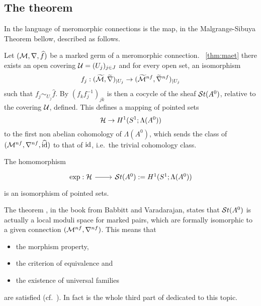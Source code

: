 \subsection{The theorem}
In the language of meromorphic connections is the map, in the Malgrange-Sibuya
Theorem bellow, described as follows.

Let $(\mathcal{M},\nabla,\widehat f)$ be a marked germ of a  meromorphic connection.
~\ref{thm:maet} there exists an open covering
$\mathcal{U}=(U_j)_{j\in J}$ and for every open set, an isomorphism
\[
  f_j:(\widetilde{\mathcal{M}},\widetilde\nabla)_{|U_j}
  \to(\widetilde{\mathcal{M}}^{nf},\widetilde\nabla^{nf})_{|U_j}
\]
such that $f_j\sim_{U_j}\hat f$.
By $(f_kf_j^{-1})_{jk}$ is then a cocycle of the sheaf $\mathcal{S}{}t(A^0)$, relative
to the covering $\mathcal{U}$, defined.
This defines a mapping of pointed sets
\[
  \mathcal{H}\to H^1(S^1;\Lambda(A^0))
\]
to the first non abelian cohomology of $\Lambda(A^0)$, which sends the class of
$(\mathcal{M}^{nf},\nabla^{nf},\widehat{\operatorname{id}})$ to that of $\operatorname{id}$, i.e.\ the trivial cohomology
class.

\begin{center}
  \begin{minipage}[t]{0.8\textwidth}
    \begin{tthm} \label{thm:mainThm1MeromVersion}
      The homomorphism
      \[ \begin{tikzcd}
          \exp:\cH \rar& \St(A^0):=H^1(S^1;\Lambda(A^0))
      \end{tikzcd} \]
      is an isomorphism of pointed sets.
    \end{tthm}
  \end{minipage}
\end{center}
\begin{rem}
  \PROBLEM[doppelt]
  The theorem \cite[Thm.III.1.1.2]{babbitt1989local}, in the book from
  Babbitt and Varadarajan, states that $\mathcal{S}{}t(A^0)$
  is actually a local moduli space for marked pairs, which are formally
  isomorphic to a given connection $(\mathcal{M}^{nf},\nabla^{nf})$. This means that
  \begin{itemize}
    \item the morphism property,
    \item the criterion of equivalence and
    \item the existence of universal families
  \end{itemize}
  are satisfied (cf.\ \cite[169]{babbitt1989local}).
  In fact is the whole third part of \cite{babbitt1989local} dedicated to this
  topic.
\end{rem}

